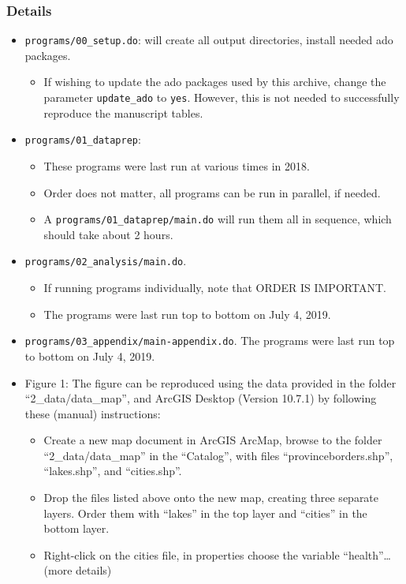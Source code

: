 \documentclass[
]{article}
\providecommand{\tightlist}{%
  \setlength{\itemsep}{0pt}\setlength{\parskip}{0pt}}
\begin{document}
\hypertarget{details-1}{%
\subsubsection{Details}\label{details-1}}

\begin{itemize}
\tightlist
\item
  \texttt{programs/00\_setup.do}: will create all output directories,
  install needed ado packages.

  \begin{itemize}
  \tightlist
  \item
    If wishing to update the ado packages used by this archive, change
    the parameter \texttt{update\_ado} to \texttt{yes}. However, this is
    not needed to successfully reproduce the manuscript tables.
  \end{itemize}
\item
  \texttt{programs/01\_dataprep}:

  \begin{itemize}
  \tightlist
  \item
    These programs were last run at various times in 2018.
  \item
    Order does not matter, all programs can be run in parallel, if
    needed.
  \item
    A \texttt{programs/01\_dataprep/main.do} will run them all in
    sequence, which should take about 2 hours.
  \end{itemize}
\item
  \texttt{programs/02\_analysis/main.do}.

  \begin{itemize}
  \tightlist
  \item
    If running programs individually, note that ORDER IS IMPORTANT.
  \item
    The programs were last run top to bottom on July 4, 2019.
  \end{itemize}
\item
  \texttt{programs/03\_appendix/main-appendix.do}. The programs were
  last run top to bottom on July 4, 2019.
\item
  Figure 1: The figure can be reproduced using the data provided in the
  folder ``2\_data/data\_map'', and ArcGIS Desktop (Version 10.7.1) by
  following these (manual) instructions:

  \begin{itemize}
  \tightlist
  \item
    Create a new map document in ArcGIS ArcMap, browse to the folder
    ``2\_data/data\_map'' in the ``Catalog'', with files
    ``provinceborders.shp'', ``lakes.shp'', and ``cities.shp''.
  \item
    Drop the files listed above onto the new map, creating three
    separate layers. Order them with ``lakes'' in the top layer and
    ``cities'' in the bottom layer.
  \item
    Right-click on the cities file, in properties choose the variable
    ``health''\ldots{} (more details)
  \end{itemize}
\end{itemize}
\end{document}
